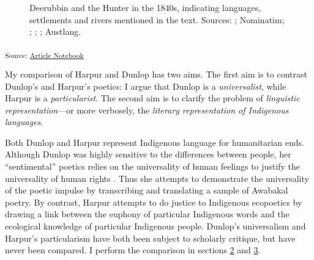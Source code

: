 \documentclass[
  Crown,
  times,
  sageh]{sagej}
\begin{document}
\label{cell-fig-map}
\begin{figure}[H]


\caption{\label{fig-map}Deerubbin and the Hunter in the 1840s,
indicating languages, settlements and rivers mentioned in the text.
Sources: \citet{geoscience_australia_geodata_2003}; Nominatim;
\citet{lissarrague_salvage_2006}; \citet{lissarrague_gamilaraay_2003};
\citet{jones_darkinyung_2008}; Austlang.}

\end{figure}%

\textsubscript{Source:
\href{https://michaelgfalk.github.io/harpur-dunlop-wulatji/harpur-dunlop-wulatji.qmd.html}{Article
Notebook}}

My comparison of Harpur and Dunlop has two aims. The first aim is to
contrast Dunlop's and Harpur's poetics: I argue that Dunlop is a
\emph{universalist}, while Harpur is a \emph{particularist}. The second
aim is to clarify the problem of \emph{linguistic representation}---or
more verbosely, the \emph{literary representation of Indigenous
languages}.

Both Dunlop and Harpur represent Indigenous language for humanitarian
ends. Although Dunlop was highly sensitive to the differences between
people, her ``sentimental'' poetics relies on the universality of human
feelings to justify the universality of human rights
\citep{rudy_beyond_2021}. Thus she attempts to demonstrate the
universality of the poetic impulse by transcribing and translating a
sample of Awabakal poetry. By contrast, Harpur attempts to do justice to
Indigenous ecopoetics by drawing a link between the euphony of
particular Indigenous words and the ecological knowledge of particular
Indigenous people. Dunlop's universalism and Harpur's particularism have
both been subject to scholarly critique, but have never been compared. I
perform the comparison in sections
\hyperref[eliza-hamilton-dunlop-universalism]{2} and
\hyperref[charles-harpur-particularism]{3}.
\end{document}

